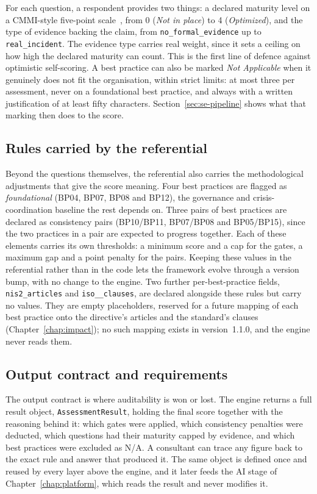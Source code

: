 For each question, a respondent provides two things: a declared maturity level on a
CMMI-style five-point scale~\cite{isaca_cmmi_cybermaturity}, from 0 (\emph{Not in place}) to 4
(\emph{Optimized}), and the
type of evidence backing the claim, from \texttt{no\_formal\_evidence} up to
\texttt{real\_incident}. The evidence type carries real weight, since it sets a
ceiling on how high the declared maturity can count. This is the first line of
defence against optimistic self-scoring. A best practice can also be marked
\emph{Not Applicable} when it genuinely does not fit the organisation, within strict
limits: at most three per assessment, never on a foundational best practice, and
always with a written justification of at least fifty characters.
Section~\ref{sec:se-pipeline} shows what that marking then does to the score.

\subsection{Rules carried by the referential}

Beyond the questions themselves, the referential also carries the methodological
adjustments that give the score meaning. Four best practices are flagged as
\emph{foundational} (BP04, BP07, BP08 and BP12), the governance and
crisis-coordination baseline the rest depends on. Three pairs of best practices are
declared as consistency pairs (BP10/BP11, BP07/BP08 and BP05/BP15), since the two
practices in a pair are expected to progress together. Each of these elements
carries its own thresholds: a minimum score and a cap for the gates, a maximum gap
and a point penalty for the pairs. Keeping these values in the referential rather
than in the code lets the framework evolve through a version bump, with no change
to the engine. Two further per-best-practice fields, \texttt{nis2\_\allowbreak articles} 
and \texttt{iso\_\_\allowbreak clauses}, are declared alongside these rules 
but carry no values. They are empty placeholders, reserved for a future mapping of 
each best practice onto the directive's articles and the standard's clauses 
(Chapter~\ref{chap:impact}); no such mapping exists in version~1.1.0, and the engine 
never reads them.

\subsection{Output contract and requirements}

The output contract is where auditability is won or lost. The engine returns a full
result object, \texttt{AssessmentResult}, holding the final score together with the
reasoning behind it: which gates were applied, which consistency penalties were
deducted, which questions had their maturity capped by evidence, and which best
practices were excluded as N/A. A consultant can trace any figure back to the exact
rule and answer that produced it. The same object is defined once and reused by
every layer above the engine, and it later feeds the AI stage of
Chapter~\ref{chap:platform}, which reads the result and never modifies it.

